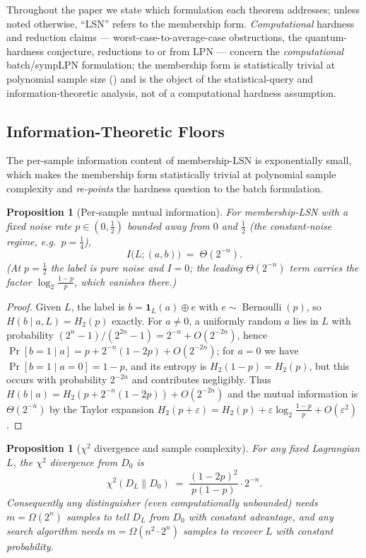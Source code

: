 \documentclass[11pt,a4paper]{article}
\theoremstyle{plain}
\newtheorem{proposition}[theorem]{Proposition}
\theoremstyle{definition}
\begin{document}
Throughout the paper we state which formulation each theorem addresses; unless noted otherwise, ``LSN'' refers to the membership form. \emph{Computational} hardness and reduction claims --- worst-case-to-average-case obstructions, the quantum-hardness conjecture, reductions to or from LPN --- concern the \emph{computational} batch/sympLPN formulation; the membership form is statistically trivial at polynomial sample size () and is the object of the statistical-query and information-theoretic analysis, not of a computational hardness assumption.

\subsection{Information-Theoretic Floors}
\label{sec:info-floors}

The per-sample information content of membership-LSN is exponentially small, which makes the membership form statistically trivial at polynomial sample complexity and \emph{re-points} the hardness question to the batch formulation.

\begin{proposition}[Per-sample mutual information]
\label{prop:per-sample-mi}
For membership-LSN with a fixed noise rate $p\in(0,\tfrac12)$ bounded away from $0$ and $\tfrac12$ (the constant-noise regime, e.g.\ $p=\tfrac14$),
\[
I\bigl(L; (a,b)\bigr) \;=\; \Theta(2^{-n}).
\]
(At $p=\tfrac12$ the label is pure noise and $I=0$; the leading $\Theta(2^{-n})$ term carries the factor $\log_2\tfrac{1-p}{p}$, which vanishes there.)
\end{proposition}

\begin{proof}
Given $L$, the label is $b = \mathbf{1}_L(a) \oplus e$ with $e \sim \operatorname{Bernoulli}(p)$, so $H(b \mid a, L) = H_2(p)$ exactly.  For $a \neq 0$, a uniformly random $a$ lies in $L$ with probability $(2^n-1)/(2^{2n}-1) = 2^{-n} + O(2^{-2n})$, hence $\Pr[b=1 \mid a] = p + 2^{-n}(1-2p) + O(2^{-2n})$; for $a=0$ we have $\Pr[b=1 \mid a=0] = 1-p$, and its entropy is $H_2(1-p) = H_2(p)$, but this occurs with probability $2^{-2n}$ and contributes negligibly.  Thus $H(b \mid a) = H_2(p + 2^{-n}(1-2p)) + O(2^{-2n})$ and the mutual information is $\Theta(2^{-n})$ by the Taylor expansion $H_2(p+\varepsilon) = H_2(p) + \varepsilon\log_2\frac{1-p}{p} + O(\varepsilon^2)$.
\end{proof}

\begin{proposition}[$\chi^2$ divergence and sample complexity]
\label{prop:chi2-sample}
For any fixed Lagrangian $L$, the $\chi^2$ divergence from $D_0$ is
\[
\chi^2(D_L \| D_0) \;=\; \frac{(1-2p)^2}{p(1-p)} \cdot 2^{-n}.
\]
Consequently any distinguisher (even computationally unbounded) needs $m = \Omega(2^n)$ samples to tell $D_L$ from $D_0$ with constant advantage, and any search algorithm needs $m = \Omega(n^2 \cdot 2^n)$ samples to recover $L$ with constant probability.
\end{proposition}
\end{document}
